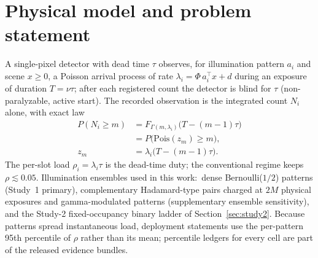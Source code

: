 \documentclass[10pt,twocolumn]{article}
\begin{document}
\section{Physical model and problem statement}
\label{sec:model}
A single-pixel detector with dead time $\tau$ observes, for illumination
pattern $a_i$ and scene $x \ge 0$, a Poisson arrival process of rate
$\lambda_i = \Phi\, a_i^{\top} x + d$ during an exposure of duration
$T = \nu\tau$; after each registered count the detector is blind for $\tau$
(non-paralyzable, active start). The recorded observation is the integrated
count $N_i$ alone, with exact law
\begin{equation}
  \begin{aligned}
  P(N_i \ge m)
    &=F_{\Gamma(m,\lambda_i)}\!\bigl(T-(m-1)\tau\bigr)\\
    &=P\bigl(\mathrm{Pois}(z_m)\ge m\bigr),\\
  z_m&=\lambda_i\bigl(T-(m-1)\tau\bigr).
  \end{aligned}
  \label{eq:exactpmf}
\end{equation}
The per-slot load $\rho_i = \lambda_i \tau$ is the dead-time duty; the
conventional regime keeps $\rho \lesssim 0.05$.
Illumination ensembles used in this work:\ dense Bernoulli($1/2$)
patterns (Study~1 primary), complementary Hadamard-type pairs charged at
$2M$ physical exposures and gamma-modulated patterns (supplementary
ensemble sensitivity), and the Study-2 fixed-occupancy binary ladder of
Section~\ref{sec:study2}. Because patterns spread instantaneous load,
deployment statements use the per-pattern 95th percentile of $\rho$
rather than its mean; percentile ledgers for every cell are part of the
released evidence bundles.
\end{document}
